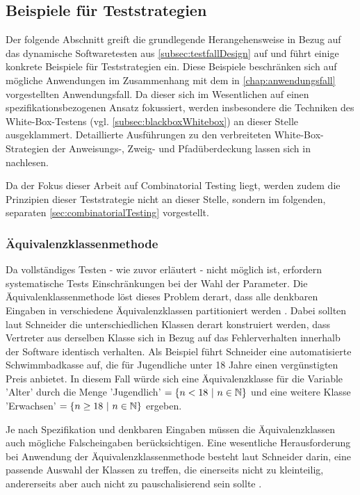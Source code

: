 \subsection{Beispiele für Teststrategien}\label{subsec:beispieleTests}

Der folgende Abschnitt greift die grundlegende Herangehensweise in Bezug auf das dynamische Softwaretesten aus \autoref{subsec:testfallDesign} auf und führt einige konkrete Beispiele für Teststrategien ein. Diese Beispiele beschränken sich auf mögliche Anwendungen im Zusammenhang mit dem in \autoref{chap:anwendungsfall} vorgestellten Anwendungsfall. Da dieser sich im Wesentlichen auf einen spezifikationsbezogenen Ansatz fokussiert, werden insbesondere die Techniken des White-Box-Testens (vgl. \autoref{subsec:blackboxWhitebox}) an dieser Stelle ausgeklammert. Detaillierte Ausführungen zu den verbreiteten White-Box-Strategien der Anweisungs-, Zweig- und Pfadüberdeckung lassen sich in \cite[S. 108 ff.]{schneider2012abenteuer} nachlesen.

Da der Fokus dieser Arbeit auf Combinatorial Testing liegt, werden zudem die Prinzipien dieser Teststrategie nicht an dieser Stelle, sondern im folgenden, separaten \autoref{sec:combinatorialTesting} vorgestellt.

\subsubsection{Äquivalenzklassenmethode}\label{subsub:äquivalenklassenmethode}

Da vollständiges Testen - wie zuvor erläutert - nicht möglich ist, erfordern systematische Tests Einschränkungen bei der Wahl der Parameter. Die Äquivalenklassenmethode löst dieses Problem derart, dass alle denkbaren Eingaben in verschiedene Äquivalenzklassen partitioniert werden \cite[S. 94]{schneider2012abenteuer}. Dabei sollten laut Schneider \cite[S. 94 ff.]{schneider2012abenteuer} die unterschiedlichen Klassen derart konstruiert werden, dass Vertreter aus derselben Klasse sich in Bezug auf das Fehlerverhalten innerhalb der Software identisch verhalten. Als Beispiel führt Schneider eine automatisierte Schwimmbadkasse auf, die für Jugendliche unter 18 Jahre einen vergünstigten Preis anbietet. In diesem Fall würde sich eine Äquivalenzklasse für die Variable 'Alter' durch die Menge 'Jugendlich' $= \{n < 18 ~ | ~ n \in \mathbb{N}\}$ und eine weitere Klasse 'Erwachsen' $= \{n \geq 18 ~ | ~ n \in \mathbb{N}\}$ ergeben. 

Je nach Spezifikation und denkbaren Eingaben müssen die Äquivalenzklassen auch mögliche Falscheingaben berücksichtigen. Eine wesentliche Herausforderung bei Anwendung der Äquivalenzklassenmethode besteht laut Schneider darin, eine passende Auswahl der Klassen zu treffen, die einerseits nicht zu kleinteilig, andererseits aber auch nicht zu pauschalisierend sein sollte \cite[S. 95]{schneider2012abenteuer}.

